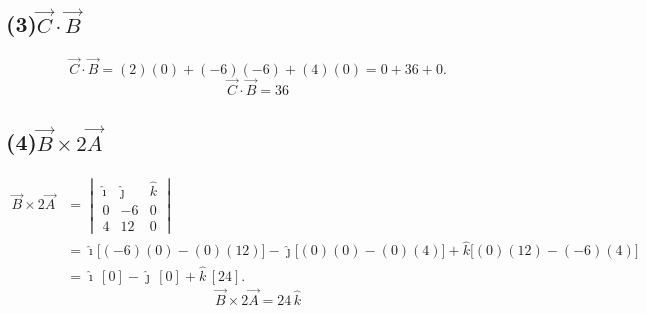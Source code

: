 \documentclass[12pt,letterpaper]{article}
\newcommand{\ii}{\hat{\imath}}
\newcommand{\jj}{\hat{\jmath}}
\newcommand{\kk}{\hat{k}}
\begin{document}
\subsection*{(3)\quad $\vec{C}\cdot\vec{B}$}
\[
    \vec{C}\cdot\vec{B} = (2)(0) + (-6)(-6) + (4)(0) = 0 + 36 + 0.
\]
\[
    \boxed{\vec{C}\cdot\vec{B} = 36}
\]

\subsection*{(4)\quad $\vec{B}\times 2\vec{A}$}
\begin{align*}
    \vec{B}\times 2\vec{A}
    &= \begin{vmatrix} \ii & \jj & \kk \\ 0 & -6 & 0 \\ 4 & 12 & 0 \end{vmatrix}\\[2pt]
    &= \ii\big[(-6)(0)-(0)(12)\big] - \jj\big[(0)(0)-(0)(4)\big] + \kk\big[(0)(12)-(-6)(4)\big]\\
    &= \ii\,[0] - \jj\,[0] + \kk\,[24].
\end{align*}
\[
    \boxed{\vec{B}\times 2\vec{A} = 24\,\kk}
\]
\end{document}
